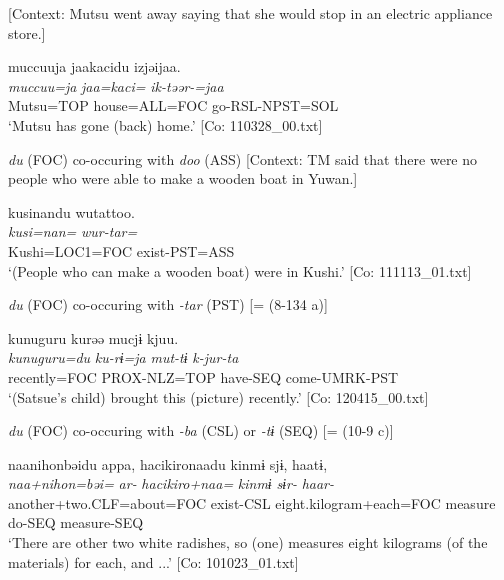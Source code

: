   [Context: Mutsu went away saying that she would stop in an electric appliance store.]

  
      \glll    muccuuja  jaakacidu  izjəijaa.\\
    \textit{muccuu=ja}  \textit{jaa=kaci=}  \textit{ik-təər-=jaa}\\
    Mutsu=TOP  house=ALL=FOC  go-RSL-NPST=SOL\\
\glt     ‘Mutsu has gone (back) home.’ [Co: 110328\_00.txt]

  \ex \textit{du} (FOC) co-occuring with \textit{doo} (ASS)
  [Context: TM said that there were no people who were able to make a wooden boat in Yuwan.]
  
      \glll    kusinandu  wutattoo.\\
    \textit{kusi=nan=}  \textit{wur-tar=}\\
    Kushi=LOC1=FOC  exist-PST=ASS\\
\glt     ‘(People who can make a wooden boat) were in Kushi.’ [Co: 111113\_01.txt]

  \ex \textit{du} (FOC) co-occuring with \textit{{}-tar} (PST) [= (8-134 a)]
  
      \glll    kunuguru  kurəə  mucjɨ\footnotemark[1]{}  kjuu.\\
    \textit{kunuguru=du}  \textit{ku-rɨ=ja}  \textit{mut-tɨ}  \textit{k-jur-ta}\\
    recently=FOC  PROX-NLZ=TOP  have-SEQ  come-UMRK-PST\\
\glt     ‘(Satsue’s child) brought this (picture) recently.’ [Co: 120415\_00.txt]

  \ex \textit{du} (FOC) co-occuring with \textit{{}-ba} (CSL) or \textit{-tɨ} (SEQ) [= (10-9 c)]

  
      \glll    naa{\textbar}nihon{\textbar}bəidu  appa,  {\textbar}hacikiro{\textbar}naadu kinmɨ  sjɨ,  haatɨ,\\
    \textit{naa+nihon=bəi=}  \textit{ar-}  \textit{hacikiro+naa=}  \textit{kinmɨ}  \textit{sɨr-}  \textit{haar-}\\
    another+two.CLF=about=FOC  exist-CSL  eight.kilogram+each=FOC  measure  do-SEQ  measure-SEQ\\    
    ‘There are other two white radishes, so (one) measures eight kilograms (of the materials) for each, and ...’    [Co: 101023\_01.txt]

